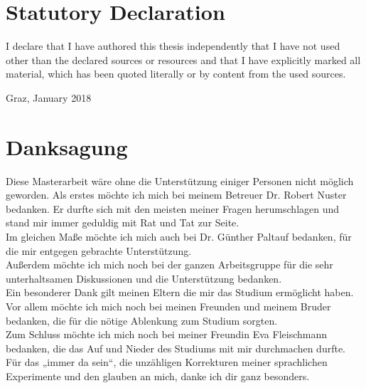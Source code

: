 \section*{}
\newpage
\thispagestyle{empty}
\section*{Statutory Declaration}
\begin{flushleft}
I declare that I have authored this thesis independently that I have not used other than the declared sources or resources and that I have explicitly marked all material, which has been quoted literally or by content from the used sources.\\

\vspace*{2.5cm}

Graz, January 2018
\end{flushleft}
\newpage
\thispagestyle{empty}
\section*{}
\newpage

\section*{Danksagung}

Diese Masterarbeit w\"{a}re ohne die Unterst\"{u}tzung einiger Personen nicht m\"{o}glich geworden. Als erstes m\"{o}chte ich mich bei meinem Betreuer Dr. Robert Nuster bedanken. Er durfte sich mit den meisten meiner Fragen herumschlagen und stand mir immer geduldig mit Rat und Tat zur Seite.\\
Im gleichen Ma{\ss}e m\"{o}chte ich mich auch bei Dr. G\"{u}nther Paltauf bedanken, f\"{u}r die mir entgegen gebrachte Unterst\"{u}tzung.\\
Au{\ss}erdem m\"{o}chte ich mich noch bei der ganzen Arbeitsgruppe f\"{u}r die sehr unterhaltsamen Diskussionen und die Unterst\"{u}tzung bedanken.\\
Ein besonderer Dank gilt meinen Eltern die mir das Studium erm\"{o}glicht haben.\\
Vor allem m\"{o}chte ich mich noch bei meinen Freunden und meinem Bruder bedanken, die f\"{u}r die n\"{o}tige Ablenkung zum Studium sorgten.\\
Zum Schluss m\"{o}chte ich mich noch bei meiner Freundin Eva Fleischmann bedanken, die das Auf und Nieder des Studiums mit mir durchmachen durfte. F\"{u}r das „immer da sein“, die unz\"{a}hligen Korrekturen meiner sprachlichen Experimente und den glauben an mich, danke ich dir ganz besonders.
\newpage
\thispagestyle{empty}
